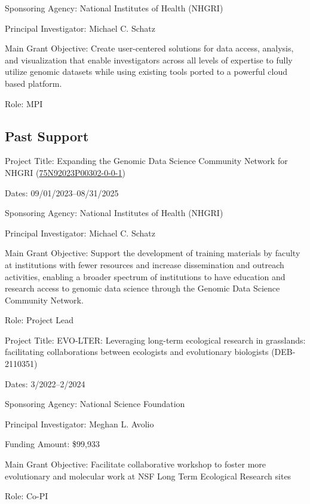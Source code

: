 \documentclass{cv}
\begin{document}
Sponsoring Agency: National Institutes of Health (NHGRI)

Principal Investigator: Michael C. Schatz

Main Grant Objective: Create user-centered solutions for data access, analysis, and visualization that enable investigators across all levels of expertise to fully utilize genomic datasets while using existing tools ported to a powerful cloud based platform.

Role: MPI

\subsection*{Past Support}

Project Title: Expanding the Genomic Data Science Community Network for NHGRI (\href{https://reporter.nih.gov/search/hBYvgxL2yUO5iw9lGMoYTA/project-details/10944109}{75N92023P00302-0-0-1})

Dates: 09/01/2023--08/31/2025

Sponsoring Agency: National Institutes of Health (NHGRI)

Principal Investigator: Michael C. Schatz

Main Grant Objective: Support the development of training materials by faculty at institutions with fewer resources and increase dissemination and outreach activities, enabling a broader spectrum of institutions to have education and research access to genomic data science through the Genomic Data Science Community Network.

Role: Project Lead

\vspace{5mm}

Project Title: EVO-LTER: Leveraging long-term ecological research in grasslands: facilitating collaborations between ecologists and evolutionary biologists (DEB-2110351)

Dates: 3/2022--2/2024

Sponsoring Agency: National Science Foundation

Principal Investigator: Meghan L. Avolio

Funding Amount: \$99,933

Main Grant Objective: Facilitate collaborative workshop to foster more evolutionary and molecular work at NSF Long Term Ecological Research sites

Role: Co-PI

\vspace{5mm}
\end{document}
